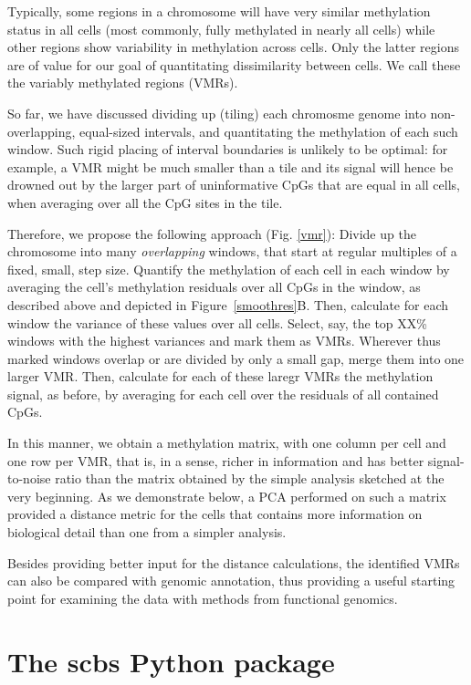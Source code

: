 \documentclass[twocolumn,10pt]{article}
\begin{document}
Typically, some regions in a chromosome will have very similar methylation status in all cells (most commonly, fully methylated in nearly all cells) while other regions show variability in methylation across cells. Only the latter regions are of value for our goal of quantitating dissimilarity between cells. We call these the variably methylated regions (VMRs).

So far, we have discussed dividing up (tiling) each chromosme genome into non-overlapping, equal-sized intervals, and quantitating the methylation of each such window. Such rigid placing of interval boundaries is unlikely to be optimal: for example, a VMR might be much smaller than a tile and its signal will hence be drowned out by the larger part of uninformative CpGs that are equal in all cells, when averaging over all the CpG sites in the tile.

Therefore, we propose the following approach (Fig. \ref{vmr}): Divide up the chromosome into many \emph{overlapping} windows, that start at regular multiples of a fixed, small, step size. Quantify the methylation of each cell in each window by averaging the cell's methylation residuals over all CpGs in the window, as described above and depicted in Figure\ \ref{smoothres}B. Then, calculate for each window the variance of these values over all cells. Select, say, the top XX\% windows with the highest variances and mark them as VMRs. Wherever thus marked windows overlap or are divided by only a small gap, merge them into one larger VMR. Then, calculate for each of these laregr VMRs the methylation signal, as before, by averaging for each cell over the residuals of all contained CpGs.

In this manner, we obtain a methylation matrix, with one column per cell and one row per VMR, that is, in a sense, richer in information and has better signal-to-noise ratio than the matrix obtained by the simple analysis sketched at the very beginning. As we demonstrate below, a PCA performed on such a matrix provided a distance metric for the cells that contains more information on biological detail than one from a simpler analysis. 

Besides providing better input for the distance calculations, the identified VMRs can also be compared with genomic annotation, thus providing a useful starting point for examining the data with methods from functional genomics.

\section{The scbs Python package}
\end{document}
